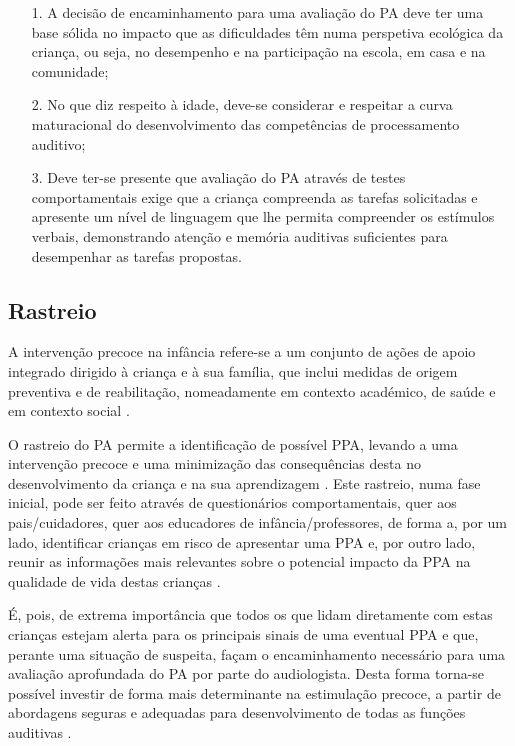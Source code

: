 \documentclass[output=paper,colorlinks,citecolor=brown,booklanguage=portuguese]{langscibook}
\begin{document}
\begin{enumerate}
    \item [1.]	A decisão de encaminhamento para uma avaliação do PA deve ter uma base sólida no impacto que as dificuldades têm numa perspetiva ecológica da criança, ou seja, no desempenho e na participação na escola, em casa e na comunidade;
\item[2.]	No que diz respeito à idade, deve-se considerar e respeitar a curva maturacional do desenvolvimento das competências de processamento auditivo;
\item[3.]	 Deve ter-se presente que avaliação do PA através de testes comportamentais exige que a criança compreenda as tarefas solicitadas e apresente um nível de linguagem que lhe permita compreender os estímulos verbais, demonstrando atenção e memória auditivas suficientes para desempenhar as tarefas propostas.
\end{enumerate}

\subsection{Rastreio}
A intervenção precoce na infância refere-se a um conjunto de ações de apoio integrado dirigido à criança e à sua família, que inclui medidas de origem preventiva e de reabilitação, nomeadamente em contexto académico, de saúde e em contexto social \citep{Goncalves2014}.

O rastreio do PA permite a identificação de possível PPA, levando a uma intervenção precoce e uma minimização das consequências desta no desenvolvimento da criança e na sua aprendizagem \citep{Tillery2009}. Este rastreio, numa fase inicial, pode ser feito através de questionários comportamentais, quer aos pais/cuidadores, quer aos educadores de infância/professores, de forma a, por um lado, identificar crianças em risco de apresentar uma PPA e, por outro lado, reunir as informações mais relevantes  sobre o potencial impacto da PPA na qualidade de vida destas crianças \citep{AAA2010, ASHA2005, Volpatto2019}.

É, pois, de extrema importância que todos os que lidam diretamente com estas crianças estejam alerta para os principais sinais de uma eventual PPA e que, perante uma situação de suspeita, façam o encaminhamento necessário para uma avaliação aprofundada do PA por parte do audiologista. Desta forma torna-se possível investir de forma mais determinante na estimulação precoce, a partir de abordagens seguras e adequadas para desenvolvimento de todas as funções auditivas \citep{ASHA2005}.
\end{document}
